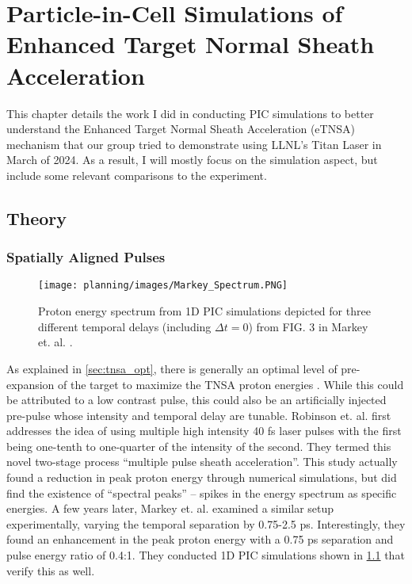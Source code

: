 \chapter{Particle-in-Cell Simulations of Enhanced Target Normal Sheath Acceleration} \label{ch:4}

This chapter details the work I did in conducting PIC simulations to better understand the Enhanced Target Normal Sheath Acceleration (eTNSA) mechanism that our group tried to demonstrate using LLNL's Titan Laser in March of 2024. As a result, I will mostly focus on the simulation aspect, but include some relevant comparisons to the experiment. 

\section{Theory}

\subsection{Spatially Aligned Pulses} \label{sec:spatialalign}

\begin{figure}
	\centering 
	\texttt{[image: planning/images/Markey\_Spectrum.PNG]}
	\caption{Proton energy spectrum from 1D PIC simulations depicted for three different temporal delays (including $\Delta t = 0$) from FIG. 3 in Markey et. al. \cite{Markey_2010_PRL}.}
	\label{fig:markey_spectrum}
\end{figure}

As explained in \cref{sec:tnsa_opt}, there is generally an optimal level of pre-expansion of the target to maximize the TNSA proton energies \cite{McKenna_2008_LaPB,Fuchs_2007_PRL}. While this could be attributed to a low contrast pulse, this could also be an artificially injected pre-pulse whose intensity and temporal delay are tunable. Robinson et. al. \cite{Robinson_2007_PPCF} first addresses the idea of using multiple high intensity 40 fs laser pulses with the first being one-tenth to one-quarter of the intensity of the second. They termed this novel two-stage process ``multiple pulse sheath acceleration''. This study actually found a reduction in peak proton energy through numerical simulations, but did find the existence of ``spectral peaks'' -- spikes in the energy spectrum as specific energies. A few years later, Markey et. al. \cite{Markey_2010_PRL} examined a similar setup experimentally, varying the temporal separation by 0.75-2.5 ps. Interestingly, they found an enhancement in the peak proton energy with a 0.75 ps separation and pulse energy ratio of 0.4:1. They conducted 1D PIC simulations shown in \cref{fig:markey_spectrum} that verify this as well.

